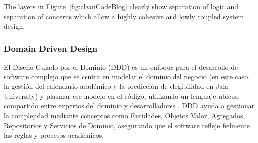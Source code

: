 The layers in Figure~\ref{fig:cleanCodeBlog} clearly show separation of logic and separation of concerns which allow a highly cohesive and lowly coupled system design.


\subsubsection{Domain Driven Design}
El Diseño Guiado por el Dominio (DDD) es un enfoque para el desarrollo de software complejo que se centra en modelar el dominio del negocio (en este caso, la gestión del calendario académico y la predicción de elegibilidad en Jala University) y plasmar ese modelo en el código, utilizando un lenguaje ubicuo compartido entre expertos del dominio y desarrolladores \parencite{Evans2003}.
DDD ayuda a gestionar la complejidad mediante conceptos como Entidades, Objetos Valor, Agregados, Repositorios y Servicios de Dominio, asegurando que el software refleje fielmente las reglas y procesos académicos.
